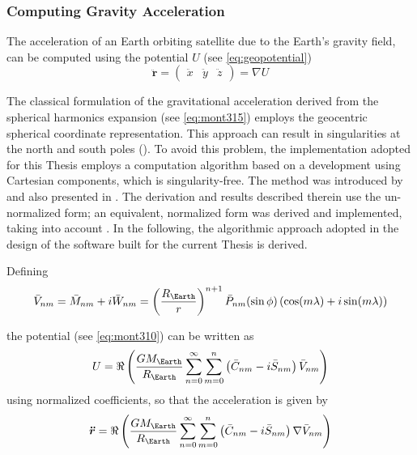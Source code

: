 \subsubsection{Computing Gravity Acceleration}\label{sssec:gravity-acceleration}

The acceleration of an Earth orbiting satellite due to the Earth's gravity field, 
can be computed using the potential $U$ (see \autoref{eq:geopotential})
\begin{equation}
  \bm{\ddot{r}} =  
    \begin{pmatrix} \ddot{x} & \ddot{y} & \ddot{z} \end{pmatrix} = 
    \nabla U
\end{equation}

The classical formulation of the gravitational acceleration derived from the spherical 
harmonics expansion (see \autoref{eq:mont315}) employs the geocentric spherical coordinate 
representation. This approach can result in singularities at the north and 
south poles (\cite{Atallah2022}). To avoid this problem, the implementation adopted 
for this Thesis employs a computation algorithm based on a development using 
Cartesian components, which is singularity-free. The method was introduced by 
\cite{Cunningham1970} and also presented in \cite{Montenbruck2000}. The derivation 
and results described therein use the un-normalized form; an equivalent, normalized 
form was derived and implemented, taking into account \cite{Atallah2022}. In the 
following, the algorithmic approach adopted in the design of the software built 
for the current Thesis is derived.

Defining
\begin{equation}
  \bar{V}_{nm} = \bar{M}_{nm} + i \bar{W}_{nm} = 
    \left( \frac{R_{\Earth}}{r} \right) ^{n+1} \bar{P}_{nm} (\sin \phi) 
      \left( \cos (m\lambda) + i \sin (m\lambda) \right)
\end{equation}

the potential (see \autoref{eq:mont310}) can be written as 
\begin{equation}
  U = \Re \left( \frac{GM_{\Earth}}{R_{\Earth}} \sum_{n=0}^{\infty} \sum_{m=0}^{n} 
    \left( \bar{C}_{nm} - i \bar{S}_{nm} \right) \bar{V}_{nm} \right)
\end{equation}
using normalized coefficients, so that the acceleration is given by
\begin{equation}
  \bm{\ddot{r}} = \Re \left( \frac{GM_{\Earth}}{R_{\Earth}} \sum_{n=0}^{\infty} \sum_{m=0}^{n} 
    \left( \bar{C}_{nm} - i \bar{S}_{nm} \right) \nabla \bar{V}_{nm} \right)
\end{equation}

